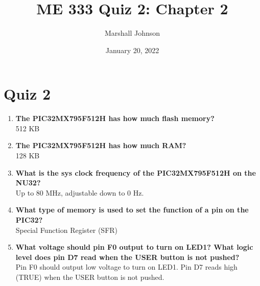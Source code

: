 \documentclass{article}
\title{ME 333 Quiz 2: Chapter 2}
\author{Marshall Johnson}
\date{January 20, 2022}
\begin{document}
\maketitle

\section*{Quiz 2}

\begin{enumerate}[label=\textbf{\arabic*})]
    \item \textbf{The PIC32MX795F512H has how much flash memory?} \\
    
    512 KB

    \item \textbf{The PIC32MX795F512H has how much RAM?} \\
    
    128 KB

    \item \textbf{What is the sys clock frequency of the PIC32MX795F512H on the NU32?} \\
    
    Up to 80 MHz, adjustable down to 0 Hz.

    \item \textbf{What type of memory is used to set the function of a pin on the PIC32?} \\
    
    Special Function Register (SFR)
    
    \item \textbf{What voltage should pin F0 output to turn on LED1? What logic level does pin D7 read when 
    the USER button is not pushed?} \\

    Pin F0 should output low voltage to turn on LED1. Pin D7 reads high (TRUE) when the USER button is
    not pushed.

    



\end{enumerate}
\end{document}
